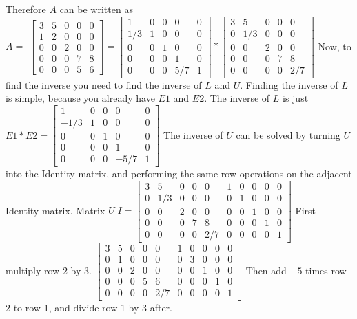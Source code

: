 \documentclass{article}
\begin{document}
Therefore $A$ can be written as \\$A =$
$\begin{bmatrix}
3&5&0&0&0 \\
1&2&0&0&0 \\
0&0&2&0&0 \\
0&0&0&7&8 \\
0&0&0&5&6
\end{bmatrix} =
\begin{bmatrix}
1&0&0&0&0 \\
1/3&1&0&0&0 \\
0&0&1&0&0 \\
0&0&0&1&0 \\
0&0&0&5/7&1
\end{bmatrix} * \begin{bmatrix}
3&5&0&0&0 \\
0&1/3&0&0&0 \\
0&0&2&0&0 \\
0&0&0&7&8 \\
0&0&0&0&2/7
\end{bmatrix}$
Now, to find the inverse you need to find the inverse of $L$ and $U$.  Finding the inverse of $L$ is simple, because you already have $E1$ and $E2$.  The inverse of $L$ is just $E1 * E2 =
\begin{bmatrix}
1&0&0&0&0 \\
-1/3&1&0&0&0 \\
0&0&1&0&0 \\
0&0&0&1&0 \\
0&0&0&-5/7&1
\end{bmatrix}$
The inverse of $U$ can be solved by turning $U$ into the Identity matrix, and performing the same row operations on the adjacent Identity matrix.
Matrix $U|I =\begin{bmatrix}
3&5&0&0&0&1&0&0&0&0 \\
0&1/3&0&0&0&0&1&0&0&0 \\
0&0&2&0&0&0&0&1&0&0 \\
0&0&0&7&8&0&0&0&1&0 \\
0&0&0&0&2/7&0&0&0&0&1
\end{bmatrix}
$
First multiply row 2 by 3. $\begin{bmatrix}
3&5&0&0&0&1&0&0&0&0 \\
0&1&0&0&0&0&3&0&0&0 \\
0&0&2&0&0&0&0&1&0&0 \\
0&0&0&5&6&0&0&0&1&0 \\
0&0&0&0&2/7&0&0&0&0&1
\end{bmatrix}$ Then add $-5$ times row 2 to row 1, and divide row 1 by 3 after.
\end{document}
